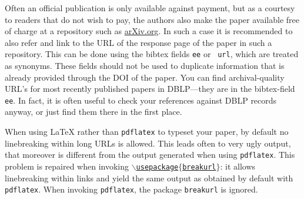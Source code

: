 \documentclass[submission,copyright,creativecommons]{eptcs}
\begin{document}
Often an official publication is only available against payment, but
as a courtesy to readers that do not wish to pay, the authors also
make the paper available free of charge at a repository such as
\url{arXiv.org}. In such a case it is recommended to also refer and
link to the URL of the response page of the paper in such a
repository.  This can be done using the bibtex fields {\tt ee} or {\tt
url}, which are treated as synonyms.  These fields should not be used
to duplicate information that is already provided through the DOI of
the paper.
You can find archival-quality URL's for most recently published papers
in DBLP---they are in the bibtex-field {\tt ee}. In fact, it is often
useful to check your references against DBLP records anyway, or just find
them there in the first place.

When using {\LaTeX} rather than {\tt pdflatex} to typeset your paper, by
default no linebreaking within long URLs is allowed. This leads often
to very ugly output, that moreover is different from the output
generated when using {\tt pdflatex}. This problem is repaired when
invoking \href{http://www.cse.unsw.edu.au/~rvg/EPTCS/breakurl.sty}
{\tt $\backslash$usepackage$\{$breakurl$\}$}: it allows linebreaking
within links and yield the same output as obtained by default with
{\tt pdflatex}. 
When invoking {\tt pdflatex}, the package {\tt breakurl} is ignored.

\nocite{*}


\end{document}
